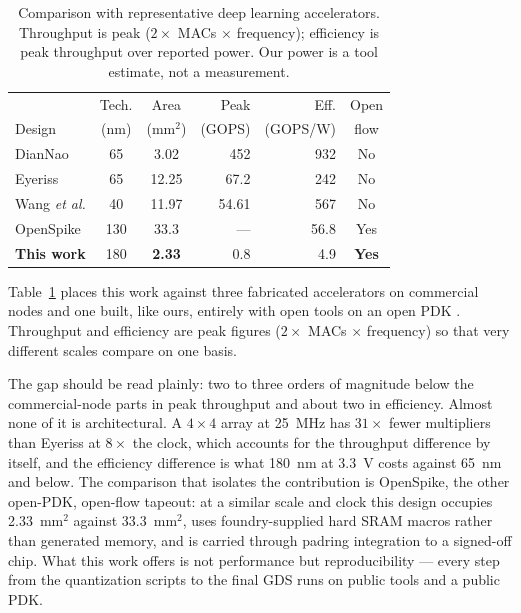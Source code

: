 \documentclass[conference,a4paper]{APSIPA2026}
\begin{document}
\begin{table}[!ht]
\caption{Comparison with representative deep learning accelerators. Throughput is peak ($2\times$ MACs $\times$ frequency); efficiency is peak throughput over reported power. Our power is a tool estimate, not a measurement.}
\label{tab:compare}
\centering
\small
\renewcommand{\arraystretch}{1.12}
\begin{tabular}{@{}lccrrc@{}}
\toprule
 & Tech. & Area & Peak & Eff. & Open \\
Design & (nm) & (mm$^2$) & (GOPS) & (GOPS/W) & flow \\
\midrule
DianNao \cite{diannao}   & 65  & 3.02  & 452   & 932 & No \\
Eyeriss \cite{eyeriss}   & 65  & 12.25 & 67.2  & 242 & No \\
Wang \emph{et al.} \cite{wang} & 40 & 11.97 & 54.61 & 567 & No \\
OpenSpike \cite{openspike} & 130 & 33.3 & ---   & 56.8 & Yes \\
\textbf{This work}       & 180 & \textbf{2.33} & 0.8 & 4.9 & \textbf{Yes} \\
\bottomrule
\end{tabular}
\end{table}
Table~\ref{tab:compare} places this work against three fabricated accelerators on commercial nodes \cite{diannao, eyeriss, wang} and one built, like ours, entirely with open tools on an open PDK \cite{openspike}. Throughput and efficiency are peak figures ($2\times$ MACs $\times$ frequency) so that very different scales compare on one basis.


The gap should be read plainly: two to three orders of magnitude below the commercial-node parts in peak throughput and about two in efficiency. Almost none of it is architectural. A $4\times4$ array at 25~MHz has $31\times$ fewer multipliers than Eyeriss at $8\times$ the clock, which accounts for the throughput difference by itself, and the efficiency difference is what 180~nm at 3.3~V costs against 65~nm and below. The comparison that isolates the contribution is OpenSpike, the other open-PDK, open-flow tapeout: at a similar scale and clock this design occupies 2.33~mm$^2$ against 33.3~mm$^2$, uses foundry-supplied hard SRAM macros rather than generated memory, and is carried through padring integration to a signed-off chip. What this work offers is not performance but reproducibility --- every step from the quantization scripts to the final GDS runs on public tools and a public PDK.
\end{document}
